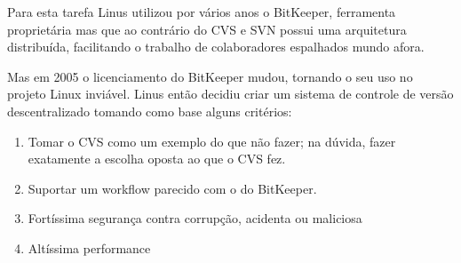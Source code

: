 Para esta tarefa Linus utilizou por vários anos o BitKeeper, ferramenta
proprietária mas que ao contrário do CVS e SVN possui uma arquitetura distribuída,
facilitando o trabalho de colaboradores espalhados mundo afora.

Mas em 2005 o licenciamento do BitKeeper mudou, tornando o seu uso no
projeto Linux inviável. Linus então decidiu criar um sistema de controle
de versão descentralizado tomando como base alguns critérios:

\begin{enumerate}

\item Tomar o CVS como  um exemplo do que não fazer; na dúvida, fazer exatamente
a escolha oposta ao que o CVS fez.

\item Suportar um workflow parecido com o do BitKeeper.

\item Fortíssima segurança contra corrupção, acidenta ou maliciosa

\item Altíssima performance

\end{enumerate}


